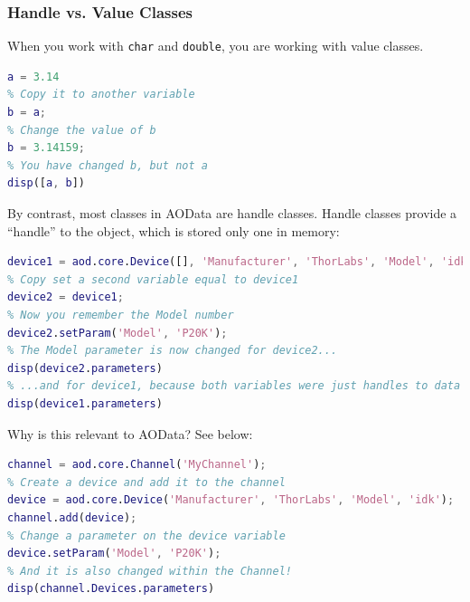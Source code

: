 \documentclass[10pt]{exam}
\newcommand\myurl[1]{\textcolor{blue}{\underline{#1}}}
\newcommand\matclass[1]{\textcolor{codeblue}{\texttt{#1}}}
\begin{document}
	\subsubsection{Handle vs. Value Classes}\label{subsubsection:HandleValue}
		\noindent When you work with \matclass{char} and \matclass{double}, you are working with value classes. 
		\begin{lstlisting}[language=matlab]
% Create a double variable
a = 3.14
% Copy it to another variable
b = a;
% Change the value of b
b = 3.14159;
% You have changed b, but not a
disp([a, b])
	\end{lstlisting}
	\noindent By contrast, most classes in AOData are handle classes. Handle classes provide a ``handle'' to the object, which is stored only one in memory:
	\begin{lstlisting}[language=matlab]
% Create a standalone Device class. It's from ThorLabs but you don't remember the Model
device1 = aod.core.Device([], 'Manufacturer', 'ThorLabs', 'Model', 'idk');
% Copy set a second variable equal to device1
device2 = device1;
% Now you remember the Model number
device2.setParam('Model', 'P20K');
% The Model parameter is now changed for device2...
disp(device2.parameters)
% ...and for device1, because both variables were just handles to data that exists only once in memory
disp(device1.parameters)
		\end{lstlisting}
		\noindent Why is this relevant to AOData? See below:
		\begin{lstlisting}[language=matlab]
% Create a channel
channel = aod.core.Channel('MyChannel');
% Create a device and add it to the channel
device = aod.core.Device('Manufacturer', 'ThorLabs', 'Model', 'idk');
channel.add(device);
% Change a parameter on the device variable
device.setParam('Model', 'P20K');
% And it is also changed within the Channel!
disp(channel.Devices.parameters)
		\end{lstlisting}
	
\end{document}
